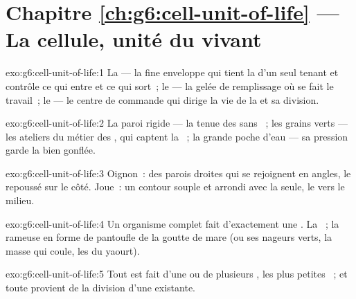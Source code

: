 \section*{Chapitre \ref{ch:g6:cell-unit-of-life} --- La cellule, unité du vivant}

\begin{solution}{exo:g6:cell-unit-of-life:1}
La  --- la fine enveloppe qui tient la  d'un seul
tenant et contrôle ce qui entre et ce qui sort~; le  ---
la gelée de remplissage où se fait le travail~; le  --- le
centre de commande qui dirige la vie de la  et sa division.
\end{solution}

\begin{solution}{exo:g6:cell-unit-of-life:2}
La paroi rigide --- la tenue des  sans ~; les grains verts
--- les ateliers du métier des , qui captent la
~; la grande poche d'eau --- sa pression garde la 
bien gonflée.
\end{solution}

\begin{solution}{exo:g6:cell-unit-of-life:3}
Oignon~: des parois droites qui se rejoignent en angles, le 
repoussé sur le côté. Joue~: un contour souple et arrondi avec la
 seule, le  vers le milieu.
\end{solution}

\begin{solution}{exo:g6:cell-unit-of-life:4}
Un organisme complet fait d'exactement une . La ~; la
rameuse en forme de pantoufle de la goutte de mare (ou ses nageurs
verts, la masse qui coule, les  du yaourt).
\end{solution}

\begin{solution}{exo:g6:cell-unit-of-life:5}
Tout  est fait d'une ou de plusieurs , les plus
petites ~; et toute  provient de la division
d'une  existante.
\end{solution}

